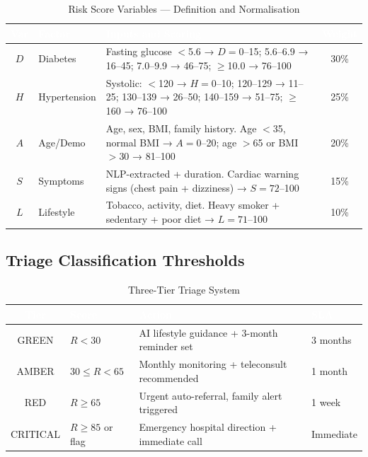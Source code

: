 \documentclass[12pt, a4paper]{article}
\begin{document}
\begin{table}[H]
\centering
\caption{Risk Score Variables — Definition and Normalisation}
\small
\begin{tabularx}{\linewidth}{@{}clXc@{}}
\toprule
\rowcolor{navycolor}
\textcolor{white}{\textbf{Var}} &
\textcolor{white}{\textbf{Factor}} &
\textcolor{white}{\textbf{Inputs and Scoring}} &
\textcolor{white}{\textbf{Weight}} \\
\midrule
$D$ & Diabetes     & Fasting glucose $<$5.6 → $D{=}0$--15; 5.6--6.9 → 16--45; 7.0--9.9 → 46--75; $\ge$10.0 → 76--100 & 30\% \\
\rowcolor{gray10}
$H$ & Hypertension & Systolic: $<$120 → $H{=}0$--10; 120--129 → 11--25; 130--139 → 26--50; 140--159 → 51--75; $\ge$160 → 76--100 & 25\% \\
$A$ & Age/Demo     & Age, sex, BMI, family history. Age $<$35, normal BMI → $A{=}0$--20; age $>$65 or BMI $>$30 → 81--100 & 20\% \\
\rowcolor{gray10}
$S$ & Symptoms     & NLP-extracted + duration. Cardiac warning signs (chest pain + dizziness) → $S{=}72$--100 & 15\% \\
$L$ & Lifestyle    & Tobacco, activity, diet. Heavy smoker + sedentary + poor diet → $L{=}71$--100 & 10\% \\
\bottomrule
\end{tabularx}
\end{table}

\subsection{Triage Classification Thresholds}

\begin{table}[H]
\centering
\caption{Three-Tier Triage System}
\small
\begin{tabularx}{\linewidth}{@{}clXl@{}}
\toprule
\rowcolor{navycolor}
\textcolor{white}{\textbf{Tier}} &
\textcolor{white}{\textbf{Score}} &
\textcolor{white}{\textbf{Action}} &
\textcolor{white}{\textbf{SLA}} \\
\midrule
\rowcolor{codegreen!10}
GREEN   & $R < 30$      & AI lifestyle guidance + 3-month reminder set  & 3 months \\
\rowcolor{riskamber!10}
AMBER   & $30 \le R < 65$ & Monthly monitoring + teleconsult recommended  & 1 month \\
\rowcolor{riskred!10}
RED     & $R \ge 65$    & Urgent auto-referral, family alert triggered  & 1 week \\
\rowcolor{riskred!20}
CRITICAL & $R \ge 85$ or flag & Emergency hospital direction + immediate call & Immediate \\
\bottomrule
\end{tabularx}
\end{table}
\end{document}
